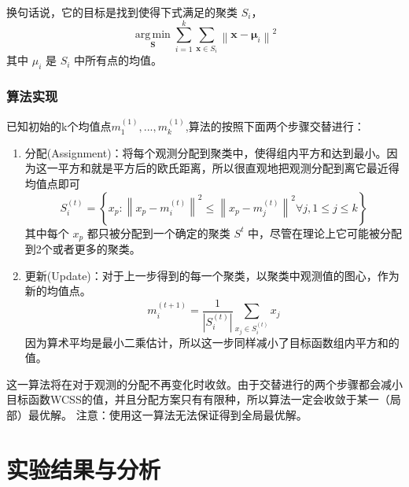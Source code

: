 \documentclass{ML}
\begin{document}
换句话说，它的目标是找到使得下式满足的聚类 $S_{i}$，$${\underset  {{\mathbf  {S}}}{\operatorname {arg\,min}}}\sum _{{i=1}}^{{k}}\sum _{{{\mathbf  x}\in S_{i}}}\left\|{\mathbf  x}-{\boldsymbol  \mu }_{i}\right\|^{2}$$
其中 $\mu_{i}$ 是 $S_{i}$ 中所有点的均值。

\subsubsection{算法实现}
已知初始的k个均值点$m_{1}^{{(1)}},...,m_{k}^{{(1)}}$,算法的按照下面两个步骤交替进行：

\begin{enumerate}
	\item 分配(Assignment)：将每个观测分配到聚类中，使得组内平方和达到最小。因为这一平方和就是平方后的欧氏距离，所以很直观地把观测分配到离它最近得均值点即可$$S_{i}^{{(t)}}=\left\{x_{p}:\left\|x_{p}-m_{i}^{{(t)}}\right\|^{2}\leq \left\|x_{p}-m_{j}^{{(t)}}\right\|^{2}\forall j,1\leq j\leq k\right\}$$其中每个 $x_{p}$ 都只被分配到一个确定的聚类 $S^{{t}}$ 中，尽管在理论上它可能被分配到2个或者更多的聚类。
	\item 更新(Update)：对于上一步得到的每一个聚类，以聚类中观测值的图心，作为新的均值点。$$m_{i}^{{(t+1)}}={\frac{1}{\left|S_{i}^{{(t)}}\right|}}\sum _{{x_{j}\in S_{i}^{{(t)}}}}x_{j}$$因为算术平均是最小二乘估计，所以这一步同样减小了目标函数组内平方和的值。
\end{enumerate}

这一算法将在对于观测的分配不再变化时收敛。由于交替进行的两个步骤都会减小目标函数WCSS的值，并且分配方案只有有限种，所以算法一定会收敛于某一（局部）最优解。
注意：使用这一算法无法保证得到全局最优解。

\section{实验结果与分析}
\end{document}
